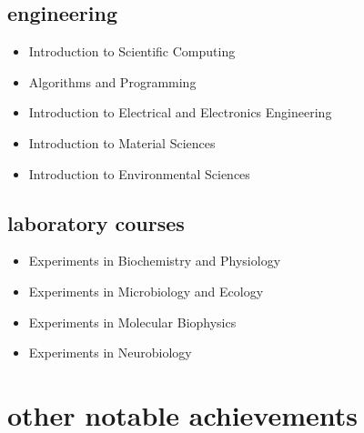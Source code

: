 \documentclass[11pt]{friggeri-cv}%
\begin{document}
\begin{multicols}{2}[]
\begin{minipage}{1.05\columnwidth}
\subsection{engineering}
\begin{itemize}
\item Introduction to Scientific Computing
\item Algorithms and Programming
\item Introduction to Electrical and Electronics Engineering
\item Introduction to Material Sciences
\item Introduction to Environmental Sciences
\end{itemize}

\subsection{laboratory courses}
\begin{itemize}
\item Experiments in Biochemistry and Physiology
\item Experiments in Microbiology and Ecology
\item Experiments in Molecular Biophysics
\item Experiments in Neurobiology
\end{itemize}



\end{minipage}

\end{multicols}



\section{other notable achievements}
\end{document}
